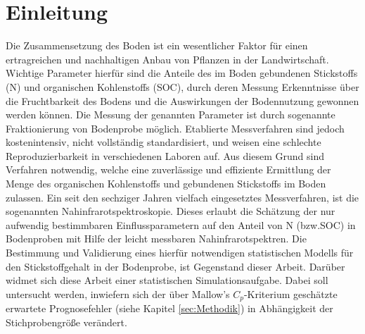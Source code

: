 \section{Einleitung}
\label{sec:Einleitung}
    Die Zusammensetzung des Boden ist ein wesentlicher Faktor für einen ertragreichen und nachhaltigen Anbau von Pflanzen in der Landwirtschaft.
    Wichtige Parameter hierfür sind die Anteile des im Boden gebundenen Stickstoffs (N) und organischen Kohlenstoffs (SOC), durch deren Messung Erkenntnisse über die Fruchtbarkeit des Bodens und die Auswirkungen der Bodennutzung gewonnen werden können.\cite{Poeplau2013}
    Die Messung der genannten Parameter ist durch sogenannte Fraktionierung von Bodenprobe möglich.
    Etablierte Messverfahren sind jedoch kostenintensiv, nicht vollständig standardisiert, und weisen eine schlechte Reproduzierbarkeit in verschiedenen Laboren auf.\cite{Poeplau2013}
    Aus diesem Grund sind Verfahren notwendig, welche eine zuverlässige und effiziente Ermittlung der Menge des organischen Kohlenstoffs und gebundenen Stickstoffs im Boden zulassen.
    Ein seit den sechziger Jahren vielfach eingesetztes Messverfahren, ist die sogenannten Nahinfrarotspektroskopie.\cite{Agelet2010}
    Dieses erlaubt die Schätzung der nur aufwendig bestimmbaren Einflussparametern auf den Anteil von N (bzw.SOC) in Bodenproben mit Hilfe der leicht messbaren Nahinfrarotspektren.
    Die Bestimmung und Validierung eines hierfür notwendigen statistischen Modells für den Stickstoffgehalt in der Bodenprobe, ist Gegenstand dieser Arbeit.
    Darüber widmet sich diese Arbeit einer statistischen Simulationsaufgabe.
    Dabei soll untersucht werden, inwiefern sich der über Mallow's $C_p$-Kriterium geschätzte erwartete Prognosefehler (siehe Kapitel \ref{sec:Methodik}) in Abhängigkeit der Stichprobengröße verändert.

